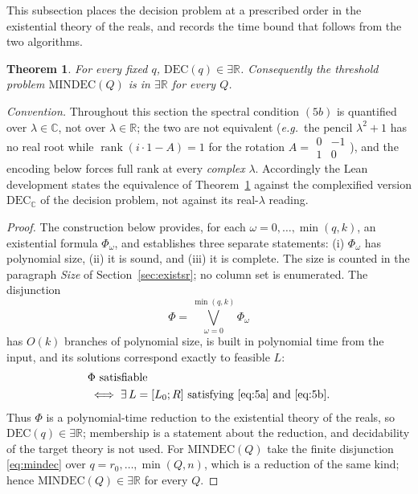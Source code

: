 \documentclass[journal]{IEEEtran}
\theoremstyle{plainn}
\newtheorem{thm}{Theorem}
\theoremstyle{remark}
\begin{document}
This subsection places the decision problem at a prescribed order in the existential theory of the reals, and records the time bound that follows from the two algorithms.

\begin{thm}\label{thm:existsr}
For every fixed $q$, $\mathrm{DEC}(q)\in\exists\mathbb R$. Consequently the threshold problem $\mathrm{MINDEC}(Q)$ is in $\exists\mathbb R$ for every $Q$.
\end{thm}

\noindent\emph{Convention.} Throughout this section the spectral condition $(5b)$ is quantified over
$\lambda\in\mathbb C$, not over $\lambda\in\mathbb R$; the two are not equivalent (\emph{e.g.}\ the
pencil $\lambda^2+1$ has no real root while $\operatorname{rank}(i\cdot1-A)=1$ for the rotation
$A=\begin{smallmatrix}0&-1\\1&0\end{smallmatrix}$), and the encoding below forces full rank at every
\emph{complex} $\lambda$. Accordingly the Lean development states the equivalence of
Theorem~\ref{thm:existsr} against the complexified version $\mathrm{DEC}_{\mathbb C}$ of the decision
problem, not against its real-$\lambda$ reading.

\begin{proof}
The construction below provides, for each $\omega=0,\dots,\min(q,k)$, an existential formula
$\Phi_\omega$, and establishes three separate statements: (i) $\Phi_\omega$ has polynomial size,
(ii) it is sound, and (iii) it is complete. The size is counted in the paragraph \emph{Size} of
Section~\ref{sec:existsr}; no column set is enumerated. The disjunction
\begin{equation}\label{eq:existsr-disj}
\Phi=\bigvee_{\omega=0}^{\min(q,k)}\Phi_\omega
\end{equation}
has $O(k)$ branches of polynomial size, is built in polynomial time from the input, and its solutions correspond exactly to feasible $L$:
\begin{equation*}
\begin{aligned}
&\Phi\ \text{satisfiable}\\
&\iff\exists\,L=[L_0;R]\ \text{satisfying}\ \eqref{eq:5a}\ \text{and}\ \eqref{eq:5b}.
\end{aligned}
\end{equation*}
Thus $\Phi$ is a polynomial-time reduction to the existential theory of the reals, so
$\mathrm{DEC}(q)\in\exists\mathbb R$; membership is a statement about the reduction, and decidability of
the target theory is not used. For $\mathrm{MINDEC}(Q)$ take the finite disjunction \eqref{eq:mindec}
over $q=r_0,\dots,\min(Q,n)$, which is a reduction of the same kind; hence $\mathrm{MINDEC}(Q)\in
\exists\mathbb R$ for every $Q$.
\end{proof}
\end{document}
